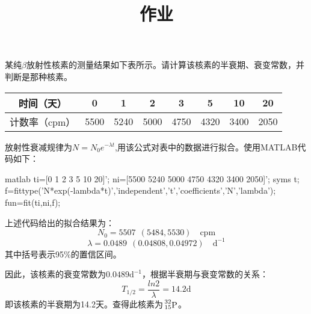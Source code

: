 



\title{作业}
\date{}
\inlinemaketitle


\begin{problem}[1]
某纯$\beta$放射性核素的测量结果如下表所示。请计算该核素的半衰期、衰变常数，并判断是那种核素。

    \begin{table}[H]
    \centering
    \label{表格}
    \begin{tabular}{|c|c|c|c|c|c|c|c|}
    \hline
    时间（天） & 0 & 1 & 2 & 3 & 5 & 10 & 20 \\
    \hline
    计数率（cpm） & 5500 & 5240 & 5000 & 4750 & 4320 & 3400 & 2050 \\
    \hline
    \end{tabular}
    \end{table}

\end{problem}

\begin{solution}
  \par
  放射性衰减规律为$N=N_0 e^{-\lambda t}$,用该公式对表中的数据进行拟合。使用MATLAB代码如下：
  \par
\begin{myminted}{matlab}
ti=[0 1 2 3 5 10 20]';
ni=[5500 5240 5000 4750 4320 3400 2050]';
syms t;
f=fittype('N*exp(-lambda*t)','independent','t','coefficients',{'N','lambda'});
fun=fit(ti,ni,f);
\end{myminted}
  \par
  上述代码给出的拟合结果为：
  \[N_0=5507\ \ (5484, 5530) \quad \text{cpm}\]
  \[\lambda = 0.0489\ \ (0.04808, 0.04972) \quad \text{d}^{-1}\]
  其中括号表示95\%的置信区间。
  \par
  因此，该核素的衰变常数为$0.0489 \text{d}^{-1}$，根据半衰期与衰变常数的关系：
  \[T_{1/2}=\frac{ln2}{\lambda}=14.2  \text{d}\]
  即该核素的半衰期为14.2天。查得此核素为$\sideset{^{32}_{15}}{}{\mathop{\mathrm{P}}}$。
\end{solution}

